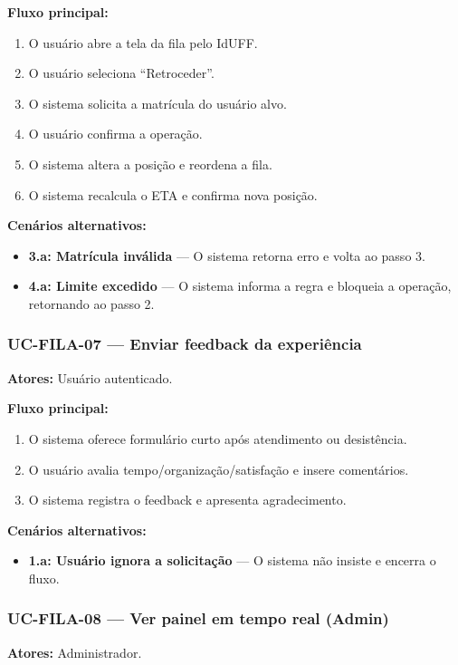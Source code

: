 \documentclass[12pt,a4paper]{article}
\begin{document}
\textbf{Fluxo principal:}
\begin{enumerate}
    \item O usuário abre a tela da fila pelo IdUFF.
    \item O usuário seleciona “Retroceder”.
    \item O sistema solicita a matrícula do usuário alvo.
    \item O usuário confirma a operação.
    \item O sistema altera a posição e reordena a fila.
    \item O sistema recalcula o ETA e confirma nova posição.
\end{enumerate}

\textbf{Cenários alternativos:}
\begin{itemize}
    \item \textbf{3.a: Matrícula inválida} — O sistema retorna erro e volta ao passo 3.
    \item \textbf{4.a: Limite excedido} — O sistema informa a regra e bloqueia a operação, retornando ao passo 2.
\end{itemize}

\subsubsection{UC-FILA-07 — Enviar feedback da experiência}
\textbf{Atores:} Usuário autenticado.  

\textbf{Fluxo principal:}
\begin{enumerate}
    \item O sistema oferece formulário curto após atendimento ou desistência.
    \item O usuário avalia tempo/organização/satisfação e insere comentários.
    \item O sistema registra o feedback e apresenta agradecimento.
\end{enumerate}

\textbf{Cenários alternativos:}
\begin{itemize}
    \item \textbf{1.a: Usuário ignora a solicitação} — O sistema não insiste e encerra o fluxo.
\end{itemize}

\subsubsection{UC-FILA-08 — Ver painel em tempo real (Admin)}
\textbf{Atores:} Administrador.  
\end{document}
